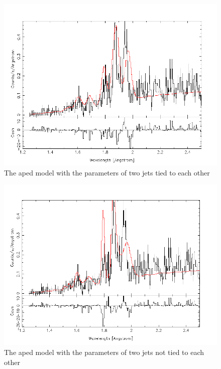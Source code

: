 \begin{figure}[h!]
    \centering
    \includegraphics[width=.8\linewidth]{Chapters/Figures/aped_model_tied.png}
    \caption{The aped model with the parameters of two jets tied to each other}
    \label{fig:my_label}
\end{figure}
\newpage
\begin{figure}[h!]
    \centering
    \includegraphics[width=.8\linewidth]{Chapters/Figures/aped_model_untied.png}
    \caption{The aped model with the parameters of two jets not tied to each other}
    \label{fig:my_label}
\end{figure}

